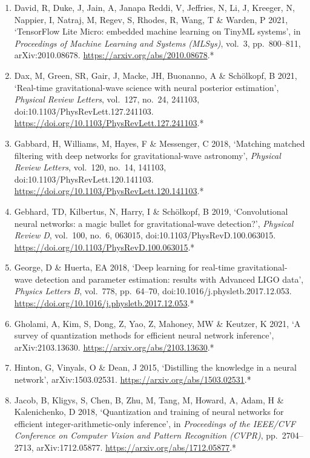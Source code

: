 \documentclass[11pt,a4paper]{article}
\begin{document}
\begin{enumerate}[label=\arabic*., leftmargin=2em]
\item David, R, Duke, J, Jain, A, Janapa Reddi, V, Jeffries, N, Li, J, Kreeger, N, Nappier, I, Natraj, M, Regev, S, Rhodes, R, Wang, T \& Warden, P 2021, `TensorFlow Lite Micro: embedded machine learning on TinyML systems', in \textit{Proceedings of Machine Learning and Systems (MLSys)}, vol.\ 3, pp.\ 800--811, arXiv:2010.08678. \url{https://arxiv.org/abs/2010.08678}.*
\item Dax, M, Green, SR, Gair, J, Macke, JH, Buonanno, A \& Sch\"{o}lkopf, B 2021, `Real-time gravitational-wave science with neural posterior estimation', \textit{Physical Review Letters}, vol.\ 127, no.\ 24, 241103, doi:10.1103/PhysRevLett.127.241103. \url{https://doi.org/10.1103/PhysRevLett.127.241103}.*
\item Gabbard, H, Williams, M, Hayes, F \& Messenger, C 2018, `Matching matched filtering with deep networks for gravitational-wave astronomy', \textit{Physical Review Letters}, vol.\ 120, no.\ 14, 141103, doi:10.1103/PhysRevLett.120.141103. \url{https://doi.org/10.1103/PhysRevLett.120.141103}.*
\item Gebhard, TD, Kilbertus, N, Harry, I \& Sch\"{o}lkopf, B 2019, `Convolutional neural networks: a magic bullet for gravitational-wave detection?', \textit{Physical Review D}, vol.\ 100, no.\ 6, 063015, doi:10.1103/PhysRevD.100.063015. \url{https://doi.org/10.1103/PhysRevD.100.063015}.*
\item George, D \& Huerta, EA 2018, `Deep learning for real-time gravitational-wave detection and parameter estimation: results with Advanced LIGO data', \textit{Physics Letters B}, vol.\ 778, pp.\ 64--70, doi:10.1016/j.physletb.2017.12.053. \url{https://doi.org/10.1016/j.physletb.2017.12.053}.*
\item Gholami, A, Kim, S, Dong, Z, Yao, Z, Mahoney, MW \& Keutzer, K 2021, `A survey of quantization methods for efficient neural network inference', arXiv:2103.13630. \url{https://arxiv.org/abs/2103.13630}.*
\item Hinton, G, Vinyals, O \& Dean, J 2015, `Distilling the knowledge in a neural network', arXiv:1503.02531. \url{https://arxiv.org/abs/1503.02531}.*
\item Jacob, B, Kligys, S, Chen, B, Zhu, M, Tang, M, Howard, A, Adam, H \& Kalenichenko, D 2018, `Quantization and training of neural networks for efficient integer-arithmetic-only inference', in \textit{Proceedings of the IEEE/CVF Conference on Computer Vision and Pattern Recognition (CVPR)}, pp.\ 2704--2713, arXiv:1712.05877. \url{https://arxiv.org/abs/1712.05877}.*

\end{enumerate}
\end{document}
